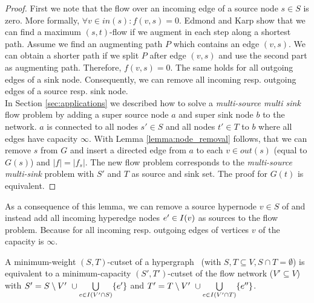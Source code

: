 \begin{proof}
First we note that the flow over an incoming edge of a source node $s \in S$ is zero.
More formally, $\forall v \in in(s): f(v,s) = 0$. Edmond and Karp \cite{edmonds1972theoretical} 
show that we can find a maximum $(s,t)$-flow if we augment in each step along a shortest path. 
Assume we find an augmenting path $P$ which contains an edge $(v,s)$. We
can obtain a shorter path if we split $P$ after edge $(v,s)$ and use the second part as
augmenting path. Therefore, $f(v,s) = 0$. The same holds for all outgoing edges of a sink
node. Consequently, we can remove all incoming resp. outgoing edges of a source resp. sink node. \\
In Section \ref{sec:applications} we described how to solve a \emph{multi-source 
multi sink} flow problem by adding a super source node $a$ and super sink node $b$ to the network.
$a$ is connected to all nodes $s' \in S$ and all nodes $t' \in T$ to $b$ 
where all edges have capacity $\infty$. With Lemma
\ref{lemma:node_removal} follows, that we can remove $s$ from $G$ and insert
a directed edge from $a$ to each $v \in out(s)$ (equal to $G(s)$) and $|f| = |f_s|$. The new flow problem
corresponds to the \emph{multi-source multi-sink} problem with $S'$ and $T$ as source
and sink set. The proof for $G(t)$ is equivalent.
\end{proof}

As a consequence of this lemma, we can remove 
a source hypernode $v \in S$ of  and instead add all
incoming hyperedge nodes $e' \in I(v)$ as sources to the flow 
problem. Because for all incoming resp. outgoing edges of vertices $v$ of 
 the capacity is $\infty$.

\begin{theorem}
\label{theorem:st_cutset_equal}
A minimum-weight $(S,T)$-cutset of a hypergraph \HypergraphDef~(with $S,T \subseteq V,
S \cap T = \emptyset$) is equivalent to a minimum-capacity $(S',T')$-cutset of the
flow network  ($V' \subseteq V$) with $S' = S \setminus V'\ \cup \bigcup\limits_{e \in I(V' \cap S)} \{e'\}$ and 
$T' = T \setminus V'\ \cup \bigcup\limits_{e \in I(V'\cap T)} \{e''\}$.
\label{theorem:heuer_network}
\end{theorem}

